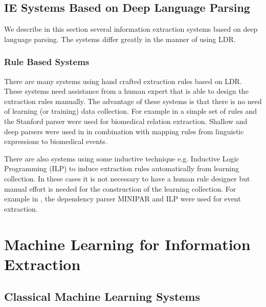 \subsection{IE Systems Based on Deep Language Parsing}


We describe in this section several information extraction systems based on deep language parsing. The systems differ greatly in the manner of using LDR.

\subsubsection{Rule Based Systems}

There are many systems using hand crafted extraction rules based on LDR. These systems need assistance from a human expert that is able to design the extraction rules manually. The advantage of these systems is that there is no need of learning (or training) data collection. For example in \citep{RelEx} a simple set of rules and the Stanford parser were used for biomedical relation extraction. Shallow and deep parsers were used in \citep{Yakushiji2001} in combination with mapping rules from linguistic expressions to biomedical events.


There are also systems using some inductive technique e.g. Inductive Logic Programming (ILP) to induce extraction rules automatically from learning collection. In these cases it is not necessary to have a human rule designer but manual effort is needed for the construction of the learning collection. For example in \citep{DBLP:conf/ilp/RamakrishnanJBS07}, the dependency parser MINIPAR and ILP were used for event extraction.



\section{Machine Learning for Information Extraction}


\subsection{Classical Machine Learning Systems}

